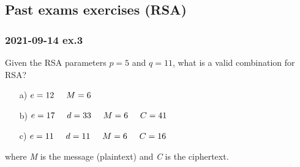 \documentclass[11pt, a4paper]{article}
\begin{document}
\newpage
\subsection{Past exams exercises (RSA)}
\subsubsection{2021-09-14 ex.3}
Given the RSA parameters $p=5$ and $q=11$, what is a valid combination for RSA?
\begin{enumerate}
    \item[a)]$e=12\hspace{0.5cm}M=6$
    \item[b)]$e=17\hspace{0.5cm}d=33\hspace{0.5cm}M=6\hspace{0.5cm}C=41$
    \item[c)]$e=11\hspace{0.5cm}d=11\hspace{0.5cm}M=6\hspace{0.5cm}C=16$
\end{enumerate}
where \textit{M} is the message (plaintext) and \textit{C} is the ciphertext.
\end{document}
